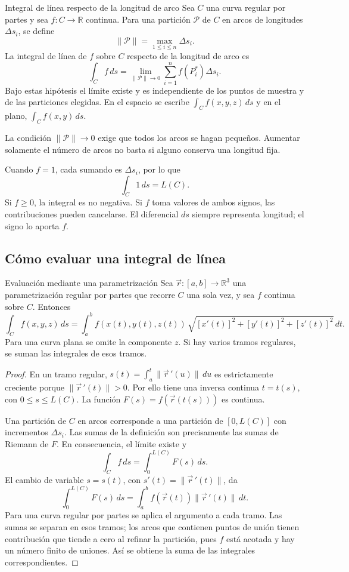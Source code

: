\begin{mydefinition}{Integral de línea respecto de la longitud de arco}
Sea $C$ una curva regular por partes y sea $f:C\to\mathbb R$ continua. Para una partición $\mathcal P$ de $C$ en arcos de longitudes $\Delta s_i$, se define
\[
\|\mathcal P\|=\max_{1\leq i\leq n}\Delta s_i.
\]
La integral de línea de $f$ sobre $C$ respecto de la longitud de arco es
\[
\int_C f\,ds
=\lim_{\|\mathcal P\|\to0}\sum_{i=1}^n f(P_i^*)\Delta s_i.
\]
Bajo estas hipótesis el límite existe y es independiente de los puntos de muestra y de las particiones elegidas. En el espacio se escribe $\int_C f(x,y,z)\,ds$ y en el plano, $\int_C f(x,y)\,ds$.
\end{mydefinition}

La condición $\|\mathcal P\|\to0$ exige que todos los arcos se hagan pequeños. Aumentar solamente el número de arcos no basta si alguno conserva una longitud fija.

Cuando $f=1$, cada sumando es $\Delta s_i$, por lo que
\[
\int_C1\,ds=L(C).
\]
Si $f\geq0$, la integral es no negativa. Si $f$ toma valores de ambos signos, las contribuciones pueden cancelarse. El diferencial $ds$ siempre representa longitud; el signo lo aporta $f$.

\subsection{Cómo evaluar una integral de línea}

\begin{mytheorem}{Evaluación mediante una parametrización}
Sea $\vec r:[a,b]\to\mathbb R^3$ una parametrización regular por partes que recorre $C$ una sola vez, y sea $f$ continua sobre $C$. Entonces
\[
\int_C f(x,y,z)\,ds
=\int_a^b f(x(t),y(t),z(t))\,
\sqrt{[x'(t)]^2+[y'(t)]^2+[z'(t)]^2}\,dt.
\]
Para una curva plana se omite la componente $z$. Si hay varios tramos regulares, se suman las integrales de esos tramos.
\end{mytheorem}

\begin{proof}
En un tramo regular, $s(t)=\int_a^t\|\vec r\,'(u)\|\,du$ es estrictamente creciente porque $\|\vec r\,'(t)\|>0$. Por ello tiene una inversa continua $t=t(s)$, con $0\leq s\leq L(C)$. La función $F(s)=f(\vec r(t(s)))$ es continua.

Una partición de $C$ en arcos corresponde a una partición de $[0,L(C)]$ con incrementos $\Delta s_i$. Las sumas de la definición son precisamente las sumas de Riemann de $F$. En consecuencia, el límite existe y
\[
\int_C f\,ds=\int_0^{L(C)}F(s)\,ds.
\]
El cambio de variable $s=s(t)$, con $s'(t)=\|\vec r\,'(t)\|$, da
\[
\int_0^{L(C)}F(s)\,ds
=\int_a^b f(\vec r(t))\|\vec r\,'(t)\|\,dt.
\]
Para una curva regular por partes se aplica el argumento a cada tramo. Las sumas se separan en esos tramos; los arcos que contienen puntos de unión tienen contribución que tiende a cero al refinar la partición, pues $f$ está acotada y hay un número finito de uniones. Así se obtiene la suma de las integrales correspondientes.
\end{proof}

